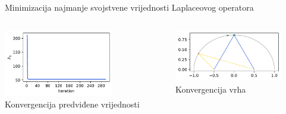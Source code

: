 \documentclass[croatian, 12pt, usepdftitle = false, xcolor = {{usenames, dvipsnames, svgnames, x11names}}, hyperref = {unicode}]{beamer}
\begin{document}
\begin{frame}{Minimizacija najmanje svojstvene vrijednosti Laplaceovog operatora}
{            \centering
            \begin{columns}
                \begin{column}{0.5\textwidth}
                    \centering
                    \includegraphics[width = 48mm]{figures/polynomial_5_minimisation_values.pdf}
                    \\
                    Konvergencija predviđene vrijednosti
                \end{column}
                \begin{column}{0.5\textwidth}
                    \centering
                    \includegraphics[width = 47mm]{figures/polynomial_5_minimisation_vertices.pdf}
                    \\
                    Konvergencija vrha
                \end{column}
            \end{columns}%
        }%
\end{frame}
\end{document}
